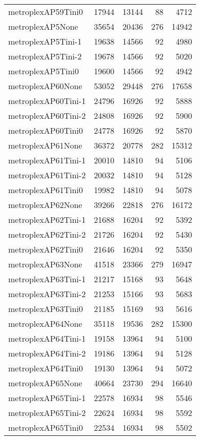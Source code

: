 \begin{longtable}{lrrrr}
metroplexAP59Tini0 & 17944 & 13144 & 88 & 4712 \\
metroplexAP5None & 35654 & 20436 & 276 & 14942 \\
metroplexAP5Tini-1 & 19638 & 14566 & 92 & 4980 \\
metroplexAP5Tini-2 & 19678 & 14566 & 92 & 5020 \\
metroplexAP5Tini0 & 19600 & 14566 & 92 & 4942 \\
metroplexAP60None & 53052 & 29448 & 276 & 17658 \\
metroplexAP60Tini-1 & 24796 & 16926 & 92 & 5888 \\
metroplexAP60Tini-2 & 24808 & 16926 & 92 & 5900 \\
metroplexAP60Tini0 & 24778 & 16926 & 92 & 5870 \\
metroplexAP61None & 36372 & 20778 & 282 & 15312 \\
metroplexAP61Tini-1 & 20010 & 14810 & 94 & 5106 \\
metroplexAP61Tini-2 & 20032 & 14810 & 94 & 5128 \\
metroplexAP61Tini0 & 19982 & 14810 & 94 & 5078 \\
metroplexAP62None & 39266 & 22818 & 276 & 16172 \\
metroplexAP62Tini-1 & 21688 & 16204 & 92 & 5392 \\
metroplexAP62Tini-2 & 21726 & 16204 & 92 & 5430 \\
metroplexAP62Tini0 & 21646 & 16204 & 92 & 5350 \\
metroplexAP63None & 41518 & 23366 & 279 & 16947 \\
metroplexAP63Tini-1 & 21217 & 15168 & 93 & 5648 \\
metroplexAP63Tini-2 & 21253 & 15166 & 93 & 5683 \\
metroplexAP63Tini0 & 21185 & 15169 & 93 & 5616 \\
metroplexAP64None & 35118 & 19536 & 282 & 15300 \\
metroplexAP64Tini-1 & 19158 & 13964 & 94 & 5100 \\
metroplexAP64Tini-2 & 19186 & 13964 & 94 & 5128 \\
metroplexAP64Tini0 & 19130 & 13964 & 94 & 5072 \\
metroplexAP65None & 40664 & 23730 & 294 & 16640 \\
metroplexAP65Tini-1 & 22578 & 16934 & 98 & 5546 \\
metroplexAP65Tini-2 & 22624 & 16934 & 98 & 5592 \\
metroplexAP65Tini0 & 22534 & 16934 & 98 & 5502 \\

\end{longtable}
